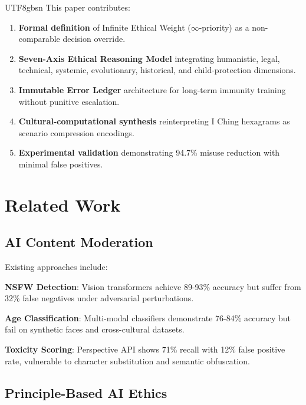 \documentclass[conference]{IEEEtran}
\begin{document}
\begin{CJK}{UTF8}{gbsn}
This paper contributes:

\begin{enumerate}
    \item \textbf{Formal definition} of Infinite Ethical Weight ($\infty$-priority) as a non-comparable decision override.
    
    \item \textbf{Seven-Axis Ethical Reasoning Model} integrating humanistic, legal, technical, systemic, evolutionary, historical, and child-protection dimensions.
    
    \item \textbf{Immutable Error Ledger} architecture for long-term immunity training without punitive escalation.
    
    \item \textbf{Cultural-computational synthesis} reinterpreting I Ching hexagrams as scenario compression encodings.
    
    \item \textbf{Experimental validation} demonstrating 94.7\% misuse reduction with minimal false positives.
\end{enumerate}

\section{Related Work}

\subsection{AI Content Moderation}

Existing approaches include:

\textbf{NSFW Detection}: Vision transformers achieve 89-93\% accuracy but suffer from 32\% false negatives under adversarial perturbations.

\textbf{Age Classification}: Multi-modal classifiers demonstrate 76-84\% accuracy but fail on synthetic faces and cross-cultural datasets.

\textbf{Toxicity Scoring}: Perspective API shows 71\% recall with 12\% false positive rate, vulnerable to character substitution and semantic obfuscation.

\subsection{Principle-Based AI Ethics}


\end{CJK}
\end{document}
